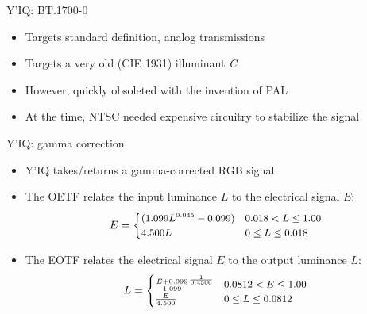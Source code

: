 \documentclass[aspectratio=169,handout,usepdftitle=false]{fireshonks}
\begin{document}
\begin{frame}{Y'IQ: BT.1700-0}
    \begin{itemize}
        \item Targets standard definition, analog transmissions
        \item Targets a very old (CIE 1931) illuminant \emph{C}
        \item However, quickly obsoleted with the invention of PAL
        \item At the time, NTSC needed expensive circuitry to stabilize the signal
    \end{itemize}

\end{frame}
\begin{frame}{Y'IQ: gamma correction}
    \begin{itemize}
        \item Y'IQ takes/returns a gamma-corrected RGB signal
        \item The OETF relates the input luminance $L$ to the electrical signal $E$: \begin{equation}
                  \small
                  E = \begin{cases}
                      (1.099L^{0.045} - 0.099) & 0.018 < L \leq 1.00 \\
                      4.500L                   & 0 \leq L \leq 0.018
                  \end{cases}
              \end{equation}
        \item The EOTF relates the electrical signal $E$ to the output luminance $L$: \begin{equation}
                  \small
                  L = \begin{cases}
                      \frac{E + 0.099}{1.099}^\frac{1}{0.4500} & 0.0812 < E \leq 1.00 \\
                      \frac{E}{4.500}                          & 0 \leq L \leq 0.0812
                  \end{cases}
              \end{equation}
    \end{itemize}
\end{frame}
\end{document}
